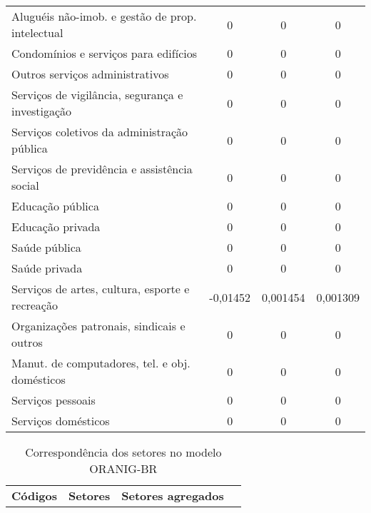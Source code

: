 \begin{apendicesenv}
\begin{small}
\begin{center}
\begin{longtable}{m{8cm}ccc}
				Aluguéis não-imob. e gestão de prop. intelectual   & 0 & 0 & 0 \\
				Condomínios e serviços para edifícios              & 0 & 0 & 0 \\
				Outros serviços administrativos                    & 0 & 0 & 0 \\
				Serviços de vigilância, segurança e investigação   & 0 & 0 & 0 \\
				Serviços coletivos da administração pública        & 0 & 0 & 0 \\
				Serviços de previdência e assistência social       & 0 & 0 & 0 \\
				Educação pública                                   & 0 & 0 & 0 \\
				Educação privada                                   & 0 & 0 & 0 \\
				Saúde pública                                      & 0 & 0 & 0 \\
				Saúde privada                                      & 0 & 0 & 0 \\
				Serviços de artes, cultura, esporte e recreação    & -0,01452 & 0,001454 & 0,001309 \\
				Organizações patronais, sindicais e outros         & 0 & 0 & 0 \\
				Manut. de computadores, tel. e obj. domésticos     & 0 & 0 & 0 \\
				Serviços pessoais                                  & 0 & 0 & 0 \\
				Serviços domésticos                                & 0 & 0 & 0 \\ \hline
			\end{longtable}
		\end{center}
	\end{small}

	\newpage

	\begin{small}
		\begin{center}
			\setlength\LTleft{-1cm}
			\begin{longtable}{lccc}
				\caption{Correspondência dos setores no modelo ORANIG-BR}\label{ap:setores} \\
				
				\hline
				\multirow{2}{*}{\textbf{Códigos}} & \multirow{2}{*}{\textbf{Setores}} & \multirow{2}{*}{\textbf{Setores agregados}} \\
				&  &  \\ \hline \endfirsthead


\end{longtable}
\end{center}
\end{small}
\end{apendicesenv}
